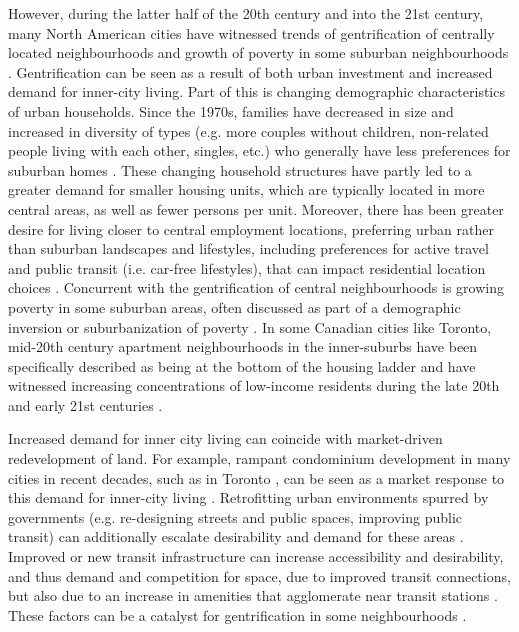 However, during the latter half of the 20th century and into the 21st century, many North American cities have witnessed trends of gentrification of centrally located neighbourhoods and growth of poverty in some suburban neighbourhoods \cite{ehrenhalt_great_2012, grant_changing_2020}. Gentrification can be seen as a result of both urban investment and increased demand for inner-city living. Part of this is changing demographic characteristics of urban households. Since the 1970s, families have decreased in size and increased in diversity of types (e.g. more couples without children, non-related people living with each other, singles, etc.) who generally have less preferences for suburban homes \cite{ley_alternative_1986,bourne_changing_2001}. These changing household structures have partly led to a greater demand for smaller housing units, which are typically located in more central areas, as well as fewer persons per unit. Moreover, there has been greater desire for living closer to central employment locations, preferring urban rather than suburban landscapes and lifestyles, including preferences for active travel and public transit (i.e. car-free lifestyles), that can impact residential location choices \cite{liao_compact_2015,cao_how_2016}. Concurrent with the gentrification of central neighbourhoods is growing poverty in some suburban areas, often discussed as part of a demographic inversion or suburbanization of poverty \cite{kneebone_suburbanization_2010,ehrenhalt_great_2012,ades_are_2012,grant_changing_2020}. In some Canadian cities like Toronto, mid-20th century apartment neighbourhoods in the inner-suburbs have been specifically described as being at the bottom of the housing ladder \cite{skaburskis_filtering_2014, august_gentrification_2018} and have witnessed increasing concentrations of low-income residents during the late 20th and early 21st centuries \cite{hulchanski_three_2010,grant_changing_2020}.

Increased demand for inner city living can coincide with market-driven redevelopment of land. For example, rampant condominium development in many cities in recent decades, such as in Toronto \cite{rosen_castles_2015}, can be seen as a market response to this demand for inner-city living \cite{davidson_new-build_2005}. Retrofitting urban environments spurred by governments (e.g. re-designing streets and public spaces, improving public transit) can additionally escalate desirability and demand for these areas \cite{zuk_gentrification_2018}. Improved or new transit infrastructure can increase accessibility and desirability, and thus demand and competition for space, due to improved transit connections, but also due to an increase in amenities that agglomerate near transit stations \cite{higgins_forty_2016,higgins_rapid_2018}. These factors can be a catalyst for gentrification in some neighbourhoods \cite{kahn_gentrification_2007,padeiro_transit-oriented_2019,delmelle_transit-induced_2021}. 

